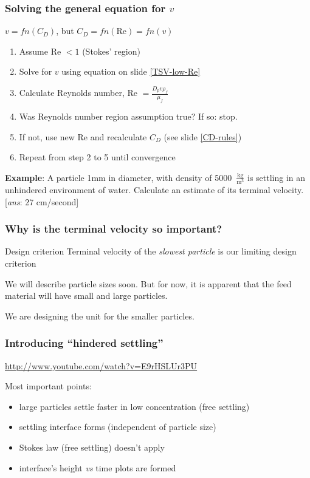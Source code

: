 \begin{frame}\frametitle{Solving the general equation for $v$}

	$v = fn(C_D)$, but $C_D = fn(\text{Re}) = fn(v)$

	\begin{enumerate}
		\item	Assume Re $< 1$ (Stokes' region)
		\item	Solve for $v$ using equation on slide \ref{TSV-low-Re}
		\item	Calculate Reynolds number, Re $= \displaystyle \frac{D_p v \rho_f}{\mu_f}$
		\item	Was Reynolds number region assumption true? If so: stop.
		\item	If not, use new Re and recalculate $C_D$ (see slide \ref{CD-rules})
		\item	Repeat from step 2 to 5 until convergence
	\end{enumerate}

	\vspace{12pt}
	\textbf{Example}: A particle 1mm in diameter, with density of 5000~$\displaystyle \frac{\text{kg}}{\text{m}^3}$ is settling in an unhindered environment of water. Calculate an estimate of its terminal velocity. [\emph{ans}: 27 cm/second]
\end{frame}

\begin{frame}\frametitle{Why is the terminal velocity so important?}
	\begin{exampleblock}{Design criterion}
		Terminal velocity of the \emph{slowest particle} is our limiting design criterion
	\end{exampleblock}
	
	\vspace{12pt}
	We will describe particle sizes soon. But for now, it is apparent that the feed material will have small and large particles.
	
	\vspace{12pt}
	We are designing the unit for the smaller particles.
\end{frame}

\begin{frame}\frametitle{Introducing ``hindered settling''}
	\href{http://www.youtube.com/watch?v=E9rHSLUr3PU}{http://www.youtube.com/watch?v=E9rHSLUr3PU}
	
	\vspace{12pt}
	Most important points:
	\begin{itemize}
		\item	large particles settle faster in low concentration (free settling)
		\item	settling interface forms (independent of particle size)
		\item	Stokes law (free settling) doesn't apply
		\item	interface's height \emph{vs} time plots are formed
	\end{itemize}
\end{frame}



